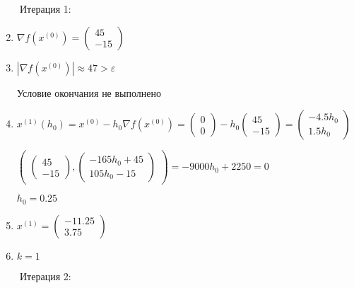 \documentclass{article}
\begin{document}
\ \ \ \ Итерация 1:

\begin{enumerate}
    \setcounter{enumi}{1}
    \item $\nabla f(x^{(0)}) = \begin{pmatrix} 45 \\ -15 \end{pmatrix}$
    \item $|\nabla f(x^{(0)})| \approx 47 > \varepsilon$
    
        Условие окончания не выполнено
    \item $x^{(1)}(h_{0}) = x^{(0)} - h_{0}\nabla f(x^{(0)}) =
        \begin{pmatrix} 0 \\ 0 \end{pmatrix} - h_{0}
        \begin{pmatrix} 45 \\ -15 \end{pmatrix} =
        \begin{pmatrix} -4.5h_{0} \\ 1.5h_{0} \end{pmatrix}$
        
        
        $\begin{pmatrix}
            \begin{pmatrix} 45 \\ -15 \end{pmatrix},
            \begin{pmatrix} -165h_{0} + 45 \\ 105h_{0} - 15 \end{pmatrix}
        \end{pmatrix} = -9000h_{0} + 2250 = 0$
        
        
        $h_{0} = 0.25$
    \item $x^{(1)} = \begin{pmatrix} -11.25 \\ 3.75 \end{pmatrix}$
    \item $k = 1$
\end{enumerate}

\ \ \ \ Итерация 2:
\end{document}
